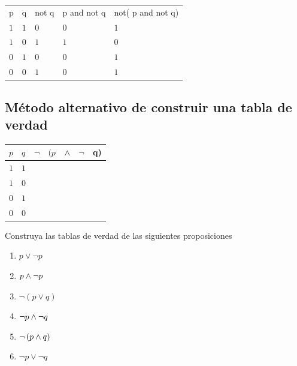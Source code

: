 \begin{solucion}
	\begin{tdv}[$\neg\left( p \wed \neg q \right)$]
		
		\hfill
		\begin{center}
			\begin{tabular}{lllll}
				p & q & not q & p and not q & not( p and not q) \\
				$1$ & $1$ & $0$ & $0$ & $1$ \\
				$1$ & $0$ & $1$ & $1$ & $0$ \\
				$0$ & $1$ & $0$ & $0$ & $1$ \\
				$0$ & $0$ & $1$ & $0$ & $1$ \\
			\end{tabular}
		\end{center}
	\end{tdv}
\end{solucion}



 \subsection{Método alternativo de construir una tabla de verdad}
\begin{center}
\begin{tabular}{|l|l|l|l|l|l|l|}\hline
 $p$ & $q$ & $\neg$ & $(p$ & $\wedge$ & $\neg$ & q) \\\hline
 $1$ & $1$ &  &  & &  & \\\hline
 $1$ & $0$ &  &  & &  & \\\hline
 $0$ & $1$ &  &  & &  & \\\hline
 $0$ & $0$ &  &  & &  & \\\hline
\end{tabular}
\end{center}




\begin{resuelto} Construya las tablas de verdad de las siguientes proposiciones
\begin{enumerate}
 \item $p\vee \neg p$
 \item $p\wedge \neg p$
 \item $\neg\left( p \vee q \right)$
 \item $\neg p \wedge \neg q$
 \item $\neg\left( p \wedge q \right)$
 \item $\neg p \vee \neg q$
\end{enumerate}


\end{resuelto}


